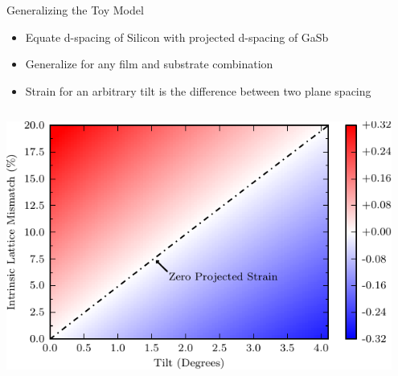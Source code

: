 \documentclass[]{beamer}%
\begin{document}
\begin{frame}
    \begin{columns}[c]
        \begin{column}{0.41\textwidth}
            \begin{block}{Generalizing the Toy Model}
                \begin{itemize}[<+-| alert@+>]
                    \item Equate d-spacing of Silicon with projected d-spacing of GaSb
                    \item Generalize for any film and substrate combination
                    \item Strain for an arbitrary tilt is the difference between two plane spacing
                \end{itemize}
            \end{block}
        \end{column}
        \begin{column}{0.57\textwidth}
        \end{column}
    \end{columns}
\end{frame}


\begin{frame}
    \begin{center}
        \includegraphics[width=0.95\textwidth]{graphics/tiltmap/step1}
    \end{center}
\end{frame}
\end{document}
